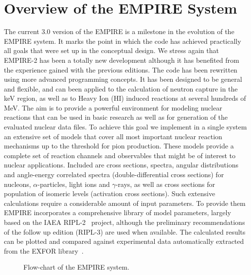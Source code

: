 \documentclass[twocolumn,amsmath,amssymb,10pt,groupedaddress,a4paper]{revtex4}
\begin{document}
\section{Overview of the EMPIRE System}
The current 3.0 version of the EMPIRE is a milestone in the evolution of the EMPIRE system. It marks the point in which the code has achieved practically all goals that were set up in the conceptual design. We stress again that EMPIRE-2 has been a totally new development although it has benefited from the experience
gained with the previous editions. The code
has been rewritten using more advanced programming concepts.
It has been designed to be general and flexible, and can been applied
to the calculation of neutron capture in the keV region, as well as
to Heavy Ion (HI) induced reactions at several hundreds of MeV. The aim is to
provide a powerful environment for modeling nuclear reactions that can be used
in basic research as well as for generation of the evaluated nuclear data files.
To achieve this goal we implement in a single system an extensive set of
models that cover all most important nuclear reaction mechanisms up to the
threshold for pion production. These models provide a complete set of reaction channels and
observables that might be of interest to nuclear applications. Included are
cross sections, spectra, angular distributions and angle-energy correlated spectra
(double-differential cross sections) for nucleons, $\alpha$-particles, light ions
and $\gamma$-rays, as well as cross sections for population of isomeric levels
(activation cross sections). Such extensive calculations require a considerable amount
of input parameters. To provide them EMPIRE incorporates a comprehensive library of model
parameters, largely based on the IAEA RIPL-2~\cite{RIPL2} project,
although the preliminary recommendations of the follow up edition (RIPL-3) are used when available. The calculated results can be plotted and compared against experimental data automatically extracted
from the EXFOR library~\cite{EXFOR}.

\begin{figure*}[htbp]
\caption{Flow-chart of the EMPIRE system.}
\label{fig:empire-flowchart}
\end{figure*}
\end{document}
